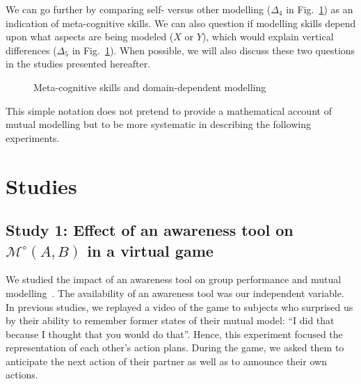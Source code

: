 \documentclass[natbib]{svjour3}
\newcommand{\Model}[3]{{$\mathcal{M}^{\circ}(#1, #2, #3)$}}
\newcommand{\gModel}[2]{{$\mathcal{M}^{\circ}(#1, #2)$}}
\begin{document}
We can go further by comparing self- versus other modelling ($\Delta_4$ in
Fig.~\ref{mm_rectangle}) as an indication of meta-cognitive skills. We can also
question if modelling skills depend upon what aspects are being modeled ($X$ or
$Y$), which would explain vertical differences ($\Delta_5$ in
Fig.~\ref{mm_rectangle}). When possible, we will also discuss these two
questions in the studies presented hereafter.

\begin{figure}[htb]
\centering


\caption{\small Meta-cognitive skills and domain-dependent modelling}

\label{mm_rectangle}
\end{figure}


This simple notation does not pretend to provide a mathematical account of
mutual modelling but to be more systematic in describing the following
experiments. 



\section{Studies}



\subsection{{\bf Study 1}: Effect of an awareness tool on \gModel{A}{B} in a virtual
game}

We studied the impact of an awareness tool on group performance and mutual
modelling~\citep{nova2007collaboration}. The availability
of an awareness tool was our independent variable. In previous studies, we
replayed a video of the game to subjects who surprised us by their ability to
remember former states of their mutual model: ``I did that because I thought that
you would do that''. Hence, this experiment focused the representation of each
other's action plans. During the game, we asked them to anticipate the next
action of their partner as well as to announce their own actions.
\end{document}
